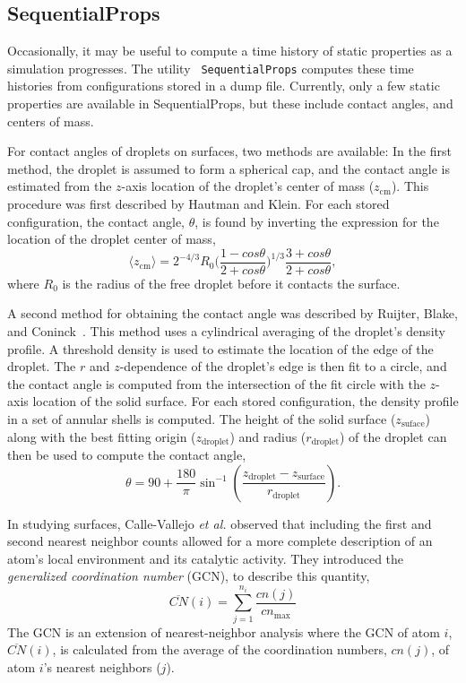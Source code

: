 \documentclass[letterpaper]{report}
\begin{document}
\subsection{\label{section:SequentialProps}SequentialProps}

Occasionally, it may be useful to compute a time history of static
properties as a simulation progresses.  The utility {\tt
  SequentialProps} computes these time histories from configurations
stored in a dump file.  Currently, only a few static properties are
available in SequentialProps, but these include contact angles, and
centers of mass.  

For contact angles of droplets on surfaces, two methods are available:
In the first method, the droplet is assumed to form a spherical cap,
and the contact angle is estimated from the $z$-axis location of the
droplet's center of mass ($z_\mathrm{cm}$).  This procedure was first
described by Hautman and Klein.\cite{Hautman91} For each stored
configuration, the contact angle, $\theta$, is found by inverting the
expression for the location of the droplet center of mass,
\begin{equation}\label{contact_1}
\langle z_\mathrm{cm}\rangle = 2^{-4/3}R_{0}\bigg(\frac{1-cos\theta}{2+cos\theta}\bigg)^{1/3}\frac{3+cos\theta}{2+cos\theta} ,
\end{equation}
where $R_{0}$ is the radius of the free droplet before it contacts the
surface. 

A second method for obtaining the contact angle was described by
Ruijter, Blake, and Coninck~\cite{Ruijter99}.  This method uses a
cylindrical averaging of the droplet's density profile.  A threshold
density is used to estimate the location of the edge of the droplet.
The $r$ and $z$-dependence of the droplet's edge is then fit to a
circle, and the contact angle is computed from the intersection of the
fit circle with the $z$-axis location of the solid surface.  For each
stored configuration, the density profile in a set of annular shells
is computed.  The height of the solid surface ($z_\mathrm{suface}$)
along with the best fitting origin ($z_\mathrm{droplet}$) and radius
($r_\mathrm{droplet}$) of the droplet can then be used to compute the
contact angle,
\begin{equation}
\theta =  90 + \frac{180}{\pi} \sin^{-1}\left(\frac{z_\mathrm{droplet} -
  z_\mathrm{surface}}{r_\mathrm{droplet}} \right).
\end{equation}

In studying surfaces, Calle-Vallejo {\it et al.}  observed that
including the first and second nearest neighbor counts allowed for a
more complete description of an atom's local environment and its
catalytic activity.\cite{Calle-Vallejo:2015qq} They introduced the
\textit{generalized coordination number} (GCN), to describe this
quantity,
\begin{equation}
  \overline{CN}(i) = \sum_{j=1}^{n_i}\frac{cn(j)}{cn_{\textrm{max}}}
  \label{eq:gcn}
\end{equation}
The GCN is an extension of nearest-neighbor analysis where the GCN of
atom $i$, $\overline{CN}(i)$, is calculated from the average of the
coordination numbers, $cn(j)$, of atom $i$'s nearest neighbors ($j$).
\end{document}
